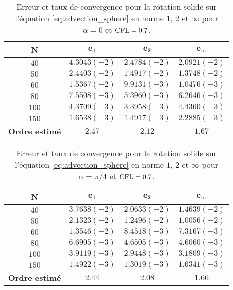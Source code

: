 \begin{table}[htbp]
\begin{center}
\begin{tabular}{|c||c|c|c|}
\hline
\textbf{N}  & $\mathbf{e_1}$ & $\mathbf{e_2}$ & $\mathbf{e_{\infty}}$\\
\hline
\hline
$40$  & $4.3043 (-2)$ & $2.4784 (-2)$ & $2.0921 (-2)$ \\
$50$  & $2.4403 (-2)$ & $1.4917 (-2)$ & $1.3748 (-2)$ \\
$60$  & $1.5367 (-2)$ & $9.9131 (-3)$ & $1.0476 (-3)$ \\
$80$  & $7.5508 (-3)$ & $5.3960 (-3)$ & $6.2646 (-3)$ \\
$100$  & $4.3709 (-3)$ & $3.3958 (-3)$ & $4.4360 (-3)$ \\
$150$  & $1.6538 (-3)$ & $1.4917 (-3)$ & $2.2885 (-3)$ \\
\hline 
\hline
\textbf{Ordre estimé}& $2.47$ & $2.12$ & $1.67$\\
\hline
\end{tabular}
\end{center}
\caption{Erreur et taux de convergence pour la rotation solide sur l'équation \eqref{eq:advection_sphere} en norme $1$, $2$ et $\infty$ pour $\alpha = 0$ et $\text{CFL} = 0.7$.}
\label{tab:rate1_bump}
\end{table} 

\begin{table}[htbp]
\begin{center}
\begin{tabular}{|c||c|c|c|}
\hline
\textbf{N}  & $\mathbf{e_1}$ & $\mathbf{e_2}$ & $\mathbf{e_{\infty}}$\\
\hline
\hline
$40$  & $3.7638 (-2)$ & $2.0633 (-2)$ & $1.4639 (-2)$ \\
$50$  & $2.1323 (-2)$ & $1.2496 (-2)$ & $1.0056 (-2)$ \\
$60$  & $1.3546 (-2)$ & $8.4518 (-3)$ & $7.3167 (-3)$ \\
$80$  & $6.6905 (-3)$ & $4.6505 (-3)$ & $4.6060 (-3)$ \\
$100$  & $3.9119 (-3)$ & $2.9448 (-3)$ & $3.1809 (-3)$ \\
$150$  & $1.4922 (-3)$ & $1.3019 (-3)$ & $1.6341 (-3)$ \\
\hline 
\hline
\textbf{Ordre estimé}& $2.44$ & $2.08$ & $1.66$\\
\hline
\end{tabular}
\end{center}
\caption{Erreur et taux de convergence pour la rotation solide sur l'équation \eqref{eq:advection_sphere} en norme $1$, $2$ et $\infty$ pour $\alpha = \pi / 4$ et $\text{CFL} = 0.7$.}
\label{tab:rate2_bump}
\end{table} 

